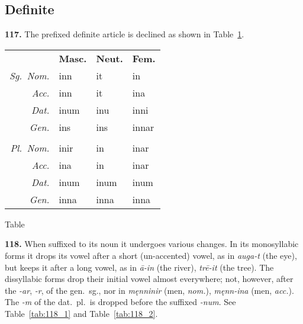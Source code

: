 \documentclass[12pt,letterpaper]{book}
\newcommand\newcaption{\small\refstepcounter{table}%
	\centering Table~\thetable}
\begin{document}
\subsection{Definite}

\textbf{117.}  The prefixed definite article is declined as shown in
Table~\ref{tab:117}.

\begin{table}[htbp]
\begin{center}
\begin{tabular}{rlll}
	& \textbf{Masc.} & \textbf{Neut.} & \textbf{Fem.} \\
	\textit{Sg.\ Nom.} & inn & it & in \\
	\textit{Acc.} & inn & it & ina \\
	\textit{Dat.} & inum & inu & inni \\
	\textit{Gen.} & ins & ins & innar \\
	\\
	\textit{Pl.\ Nom.} & inir & in & inar \\
	\textit{Acc.} & ina & in & inar \\
	\textit{Dat.} & inum & inum & inum \\
	\textit{Gen.} & inna & inna & inna \\
\end{tabular}
\end{center}
\newcaption
\label{tab:117}
\end{table}

\textbf{118.} When suffixed to its noun it undergoes various changes.  In
its monosyllabic forms it drops its vowel after a short
(un-accented) vowel, as in \textit{auga-t} (the eye), but keeps it after
a long vowel, as in \textit{ā-in} (the river), \textit{trē-it} (the tree).
The dissyllabic forms drop their initial vowel almost everywhere;
not, however, after the \textit{-ar}, \textit{-r}, of the gen.\ sg., nor in
\textit{męnninir} (men, \textit{nom.}), \textit{męnn-ina} (men, \textit{acc.}).
The \textit{-m} of the dat.\ pl.\ is dropped before the suffixed \textit{-num}.
See Table~\ref{tab:118_1} and Table~\ref{tab:118_2}.
\end{document}
